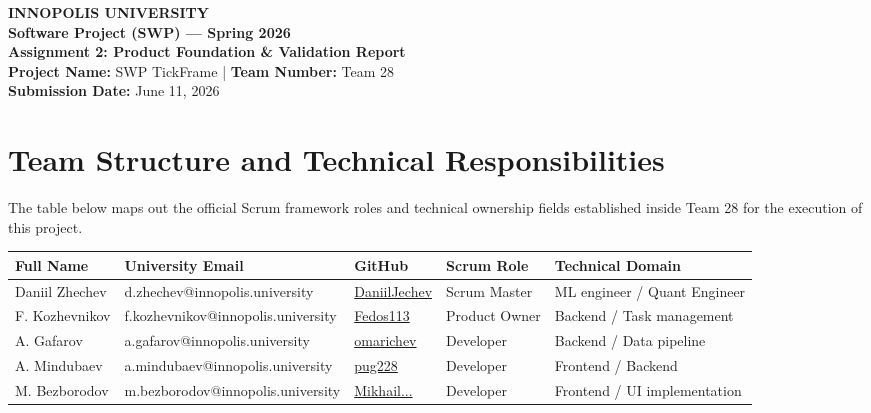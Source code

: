 \documentclass[11pt,a4paper]{article}
\begin{document}
\begin{center}
    {\large \textbf{INNOPOLIS UNIVERSITY}} \\
    \vspace{0.1cm}
    {\large \textbf{Software Project (SWP) — Spring 2026}} \\
    \vspace{0.5cm}
    \textbf{\Large Assignment 2: Product Foundation \& Validation Report} \\
    \vspace{0.3cm}
    \textbf{Project Name:} SWP TickFrame \quad | \quad \textbf{Team Number:} Team 28 \\
    \textbf{Submission Date:} June 11, 2026
\end{center}

\vspace{0.5cm}

\section{Team Structure and Technical Responsibilities}
The table below maps out the official Scrum framework roles and technical ownership fields established inside Team 28 for the execution of this project.

\vspace{0.2cm}
\begin{table}[h!]
    \centering
    \small
    \begin{tabular}{lllll}
        \toprule
        \textbf{Full Name} & \textbf{University Email} & \textbf{GitHub} & \textbf{Scrum Role} & \textbf{Technical Domain} \\
        \midrule
        Daniil Zhechev & d.zhechev@innopolis.university & \href{https://github.com/DaniilJechev}{DaniilJechev} & Scrum Master & ML engineer / Quant Engineer \\
        F. Kozhevnikov & f.kozhevnikov@innopolis.university & \href{https://github.com/Fedos113}{Fedos113} & Product Owner & Backend / Task management \\
        A. Gafarov & a.gafarov@innopolis.university & \href{https://github.com/omarichev}{omarichev} & Developer & Backend / Data pipeline \\
        A. Mindubaev & a.mindubaev@innopolis.university & \href{https://github.com/pug228}{pug228} & Developer & Frontend / Backend \\
        M. Bezborodov & m.bezborodov@innopolis.university & \href{https://github.com/MikhailBezborodov024}{Mikhail...} & Developer & Frontend / UI implementation \\
        \bottomrule
    \end{tabular}
\end{table}
\end{document}
